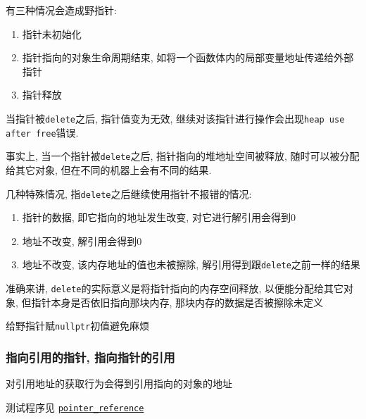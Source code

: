 有三种情况会造成野指针:
\begin{enumerate}
	\item 指针未初始化
	\item 指针指向的对象生命周期结束, 如将一个函数体内的局部变量地址传递给外部指针
	\item 指针释放
\end{enumerate}

当指针被{\tt delete}之后, 指针值变为无效, 继续对该指针进行操作会出现{\tt heap use after free}错误.

事实上, 当一个指针被{\tt delete}之后, 指针指向的堆地址空间被释放, 随时可以被分配给其它对象, 但在不同的机器上会有不同的结果.

\noindent 几种特殊情况, 指{\tt delete}之后继续使用指针不报错的情况:
\begin{enumerate}
	\item 指针的数据, 即它指向的地址发生改变, 对它进行解引用会得到0
	\item 地址不改变, 解引用会得到0
	\item 地址不改变, 该内存地址的值也未被擦除, 解引用得到跟{\tt delete}之前一样的结果
\end{enumerate}

准确来讲, {\tt delete}的实际意义是将指针指向的内存空间释放, 以便能分配给其它对象, 但指针本身是否依旧指向那块内存, 
	那块内存的数据是否被擦除未定义

给野指针赋{\tt nullptr}初值避免麻烦

\subsubsection{指向引用的指针, 指向指针的引用}
对引用地址的获取行为会得到引用指向的对象的地址

测试程序见 \href{https://github.com/wenqingqian/Obtuse/blob/main/test/cpp/basic/pointer_reference.cpp}{\tt pointer\_reference}


\subsection{}
\subsection{}
